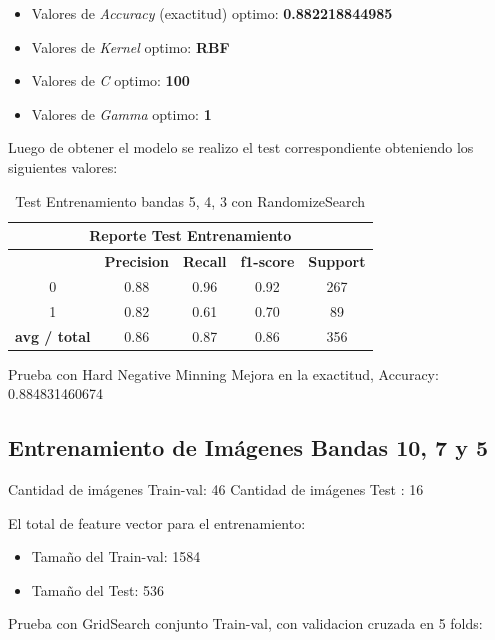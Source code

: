 \begin{itemize}
\item Valores de \textit{Accuracy} (exactitud) optimo: \textbf{0.882218844985}
\item Valores de \textit{Kernel} optimo: \textbf{RBF}
\item Valores de \textit{C} optimo: \textbf{100}
\item Valores de \textit{Gamma} optimo: \textbf{1}

\end{itemize}

Luego de obtener el modelo se realizo el test correspondiente obteniendo los siguientes valores:
\begin{table}[H]
\begin{center}
\begin{tabular}{|c|c|c|c|c|}
\hline \multicolumn{5}{|c|}{Reporte Test Entrenamiento} \\ \hline
\hline \textbf{} & \textbf{Precision} & \textbf{Recall} & \textbf{f1-score} & \textbf{Support}\\ \hline 
				 0   & 0.88 & 0.96 & 0.92  & 267	\\ \hline 
				 1   & 0.82 & 0.61 & 0.70  & 89 \\ \hline 
\textbf{avg / total} & 0.86 & 0.87 & 0.86  & 356 \\ \hline
\end{tabular}
\end{center} \caption{Test Entrenamiento bandas 5, 4, 3 con RandomizeSearch}\label{tab:RandomTest543}
\end{table}


Prueba con Hard Negative Minning
Mejora en la exactitud, Accuracy: 0.884831460674



\subsection{Entrenamiento de Imágenes Bandas 10, 7 y 5}\label{sub:entrenamiento_bandas1075}

Cantidad de imágenes Train-val: 46 
Cantidad de imágenes Test : 16  

El total de feature vector para el entrenamiento:
\begin{itemize}
\item Tamaño del Train-val: 1584
\item Tamaño del Test: 536
\end{itemize}

Prueba con GridSearch conjunto Train-val, con validacion cruzada en 5 folds:

